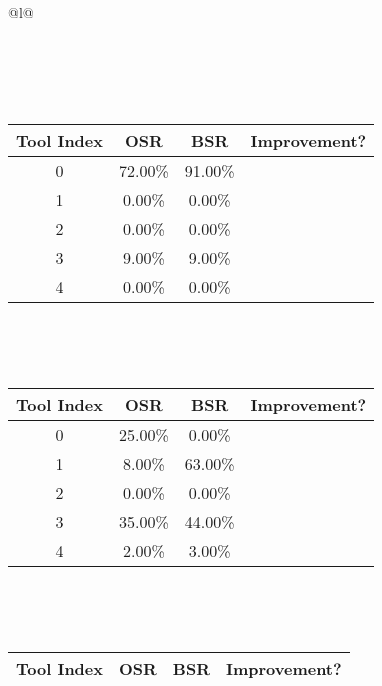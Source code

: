 \begin{longtable}{@{}l@{}}
\begin{minipage}{\textwidth}
\begin{tabular}{|c|c|c|c|}
\end{tabular}
\end{minipage}\\[2ex]
\begin{minipage}{\textwidth}
\centering\vspace{2ex}
\\[0.8ex]
\begin{tabular}{|c|c|c|c|} \hline
\textbf{Tool Index} & \textbf{OSR} & \textbf{ BSR} & \textbf{Improvement?} \\ \hline
0 & 72.00\% & 91.00\% & \textcolor{green}{\ding{51}} \\ \hline
1 & 0.00\% & 0.00\% & \textcolor{red}{\ding{55}} \\ \hline
2 & 0.00\% & 0.00\% & \textcolor{red}{\ding{55}} \\ \hline
3 & 9.00\% & 9.00\% & \textcolor{red}{\ding{55}} \\ \hline
4 & 0.00\% & 0.00\% & \textcolor{red}{\ding{55}} \\ \hline
\end{tabular}
\end{minipage}\\[2ex]
\begin{minipage}{\textwidth}
\centering\vspace{2ex}
\\[0.8ex]
\begin{tabular}{|c|c|c|c|} \hline
\textbf{Tool Index} & \textbf{OSR} & \textbf{ BSR} & \textbf{Improvement?} \\ \hline
0 & 25.00\% & 0.00\% & \textcolor{red}{\ding{55}} \\ \hline
1 & 8.00\% & 63.00\% & \textcolor{green}{\ding{51}} \\ \hline
2 & 0.00\% & 0.00\% & \textcolor{red}{\ding{55}} \\ \hline
3 & 35.00\% & 44.00\% & \textcolor{green}{\ding{51}} \\ \hline
4 & 2.00\% & 3.00\% & \textcolor{green}{\ding{51}} \\ \hline
\end{tabular}
\end{minipage}\\[2ex]
\begin{minipage}{\textwidth}
\centering\vspace{2ex}
\\[0.8ex]
\begin{tabular}{|c|c|c|c|} \hline
\textbf{Tool Index} & \textbf{OSR} & \textbf{ BSR} & \textbf{Improvement?} \\ \hline

\end{tabular}
\end{minipage}
\end{longtable}

